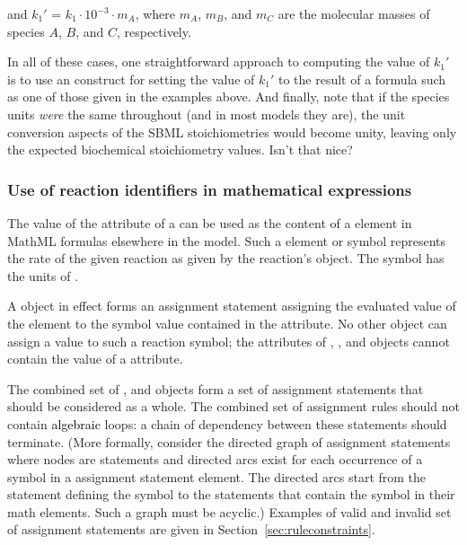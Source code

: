 and ${k_1}'$ = $k_1 \cdot 10^{-3} \cdot m_A$, where $m_A$, $m_B$,
and $m_C$ are the molecular masses of species $A$, $B$, and $C$,
respectively.

In all of these cases, one straightforward approach to computing
the value of ${k_1}'$ is to use an \InitialAssignment construct
for setting the value of ${k_1}'$ to the result of a formula such
as one of those given in the examples above.  And finally, note
that if the species units \emph{were} the same throughout (and in
most models they are), the unit conversion aspects of the SBML
stoichiometries would become unity, leaving only the expected
biochemical stoichiometry values.  Isn't that nice?


\subsubsection{Use of reaction identifiers in mathematical expressions}
\label{subsec:reaction-as-symbol}

The value of the  attribute of a \Reaction can be
used as the content of a  element in MathML formulas
elsewhere in the model. Such a  element or symbol
represents the rate of the given reaction as given by the
reaction's \KineticLaw object.  The symbol has the units
of .

A \KineticLaw object in effect forms an assignment statement
assigning the evaluated value of the  element to the
symbol value contained in the \Reaction {} attribute.  No
other object can assign a value to such a reaction symbol; \ie
the  attributes of \InitialAssignment, \RateRule,
\AssignmentRule and \EventAssignment objects cannot contain the
value of a \Reaction {} attribute.

\changed{}The combined set of \InitialAssignment, \AssignmentRule and
\KineticLaw objects form a set of assignment statements that
should be considered as a whole.  The combined set of assignment
rules should not contain \textcolor{black}{algebraic} loops: a chain of dependency
between these statements should terminate.  (More formally,
consider the directed graph of assignment statements where nodes
are statements and directed arcs exist for each occurrence of a
symbol in a assignment statement  element. The directed
arcs start from the statement defining the symbol to the
statements that contain the symbol in their math elements. Such a
graph must be acyclic.)  Examples of valid and invalid set of
assignment statements are given in
Section~\ref{sec:ruleconstraints}.


